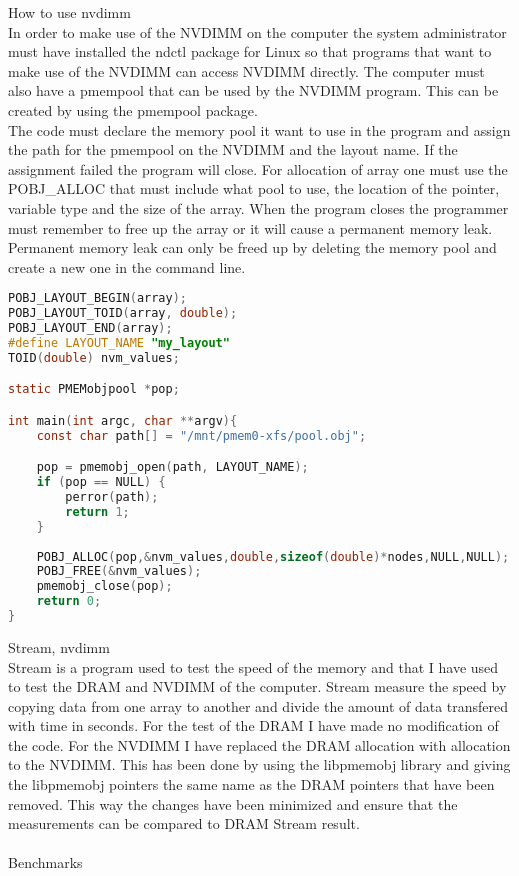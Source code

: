 \documentclass[12pt,a4paper]{article}      %
\begin{document}
How to use nvdimm\\
In order to make use of the NVDIMM on the computer the system administrator must have installed the ndctl package for Linux so that programs that want to make use of the NVDIMM can access NVDIMM directly. The computer must also have a pmempool that can be used by the NVDIMM program. This can be created by using the pmempool package.\\
The code must declare the memory pool it want to use in the program and assign the path for the pmempool on the NVDIMM and the layout name. If the assignment failed the program will close. For allocation of array one must use the POBJ\_ALLOC that must include what pool to use, the location of the pointer, variable type and the size of the array. When the program closes the programmer must remember to free up the array or it will cause a permanent memory leak. Permanent memory leak can only be freed up by deleting the memory pool and create a new one in the command line. \cite{testing}

\begin{lstlisting}[language=C]
POBJ_LAYOUT_BEGIN(array);
POBJ_LAYOUT_TOID(array, double);
POBJ_LAYOUT_END(array);
#define LAYOUT_NAME "my_layout"
TOID(double) nvm_values;

static PMEMobjpool *pop;

int main(int argc, char **argv){
	const char path[] = "/mnt/pmem0-xfs/pool.obj";

	pop = pmemobj_open(path, LAYOUT_NAME);
    if (pop == NULL) {
		perror(path);
		return 1;
    }
	
    POBJ_ALLOC(pop,&nvm_values,double,sizeof(double)*nodes,NULL,NULL);
    POBJ_FREE(&nvm_values);
    pmemobj_close(pop);
    return 0;
}
\end{lstlisting}
Stream, nvdimm\\
Stream is a program used to test the speed of the memory and that I have used to test the DRAM and NVDIMM of the computer. Stream measure the speed by copying data from one array to another and divide the amount of data transfered with time in seconds. For the test of the DRAM I have made no modification of the code. For the NVDIMM I have replaced the DRAM allocation with allocation to the NVDIMM. This has been done by using the libpmemobj library and giving the libpmemobj pointers the same name as the DRAM pointers that have been removed. This way the changes have been minimized and ensure that the measurements can be compared to DRAM Stream result.
\\
\\
Benchmarks\\
\printbibliography

\end{document}
